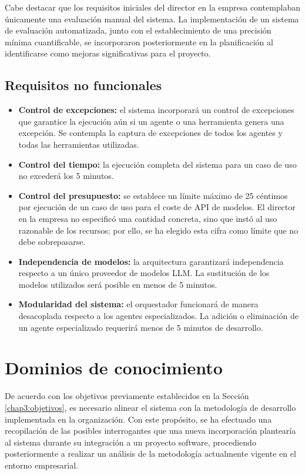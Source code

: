 Cabe destacar que los requisitos iniciales del director en la empresa contemplaban únicamente una evaluación manual del sistema. La implementación de un sistema de evaluación automatizada, junto con el establecimiento de una precisión mínima cuantificable, se incorporaron posteriormente en la planificación al identificarse como mejoras significativas para el proyecto.
\subsection{Requisitos no funcionales}
\begin{itemize}
\item\textbf{Control de excepciones: }el sistema incorporará un control de excepciones que garantice la ejecución aún si un agente o una herramienta genera una excepción. Se contempla la captura de excepciones de todos los agentes y todas las herramientas utilizadas.
\item\textbf{Control del tiempo: }la ejecución completa del sistema para un caso de uso no excederá los 5 minutos.
\item\textbf{Control del presupuesto: }se establece un límite máximo de 25 céntimos por ejecución de un caso de uso para el coste de API de modelos. El director en la empresa no especificó una cantidad concreta, sino que instó al uso razonable de los recursos; por ello, se ha elegido esta cifra como límite que no debe sobrepasarse.
\item\textbf{Independencia de modelos: }la arquitectura garantizará independencia respecto a un único proveedor de modelos LLM. La sustitución de los modelos utilizados será posible en menos de 5 minutos.
\item\textbf{Modularidad del sistema: }el orquestador funcionará de manera desacoplada respecto a los agentes especializados. La adición o eliminación de un agente especializado requerirá menos de 5 minutos de desarrollo.
\end{itemize}

\section{Dominios de conocimiento}
De acuerdo con los objetivos previamente establecidos en la Sección \ref{chap3:objetivos}, es necesario alinear el sistema con la metodología de desarrollo implementada en la organización. Con este propósito, se ha efectuado una recopilación de las posibles interrogantes que una nueva incorporación plantearía al sistema durante su integración a un proyecto software, procediendo posteriormente a realizar un análisis de la metodología actualmente vigente en el entorno empresarial.

